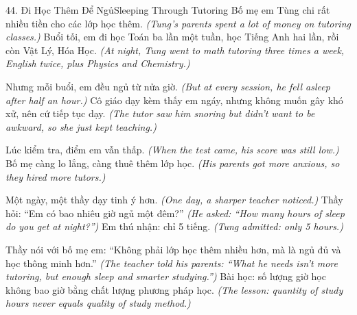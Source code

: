 \begin{truyen}{44. Đi Học Thêm Để Ngủ}{Sleeping Through Tutoring}
Bố mẹ em Tùng chi rất nhiều tiền cho các lớp học thêm.
\textit{(Tung's parents spent a lot of money on tutoring classes.)}
Buổi tối, em đi học Toán ba lần một tuần, học Tiếng Anh hai lần, rồi còn Vật Lý, Hóa Học.
\textit{(At night, Tung went to math tutoring three times a week, English twice, plus Physics and Chemistry.)}

Nhưng mỗi buổi, em đều ngủ từ nửa giờ.
\textit{(But at every session, he fell asleep after half an hour.)}
Cô giáo dạy kèm thấy em ngáy, nhưng không muốn gây khó xử, nên cứ tiếp tục dạy.
\textit{(The tutor saw him snoring but didn't want to be awkward, so she just kept teaching.)}

Lúc kiểm tra, điểm em vẫn thấp.
\textit{(When the test came, his score was still low.)}
Bố mẹ càng lo lắng, càng thuê thêm lớp học.
\textit{(His parents got more anxious, so they hired more tutors.)}

Một ngày, một thầy dạy tinh ý hơn.
\textit{(One day, a sharper teacher noticed.)}
Thầy hỏi: ``Em có bao nhiêu giờ ngủ một đêm?''
\textit{(He asked: ``How many hours of sleep do you get at night?'')}
Em thú nhận: chỉ 5 tiếng.
\textit{(Tung admitted: only 5 hours.)}

Thầy nói với bố mẹ em: ``Không phải lớp học thêm nhiều hơn, mà là ngủ đủ và học thông minh hơn.''
\textit{(The teacher told his parents: ``What he needs isn't more tutoring, but enough sleep and smarter studying.'')}
Bài học: số lượng giờ học không bao giờ bằng chất lượng phương pháp học.
\textit{(The lesson: quantity of study hours never equals quality of study method.)}
\end{truyen}


